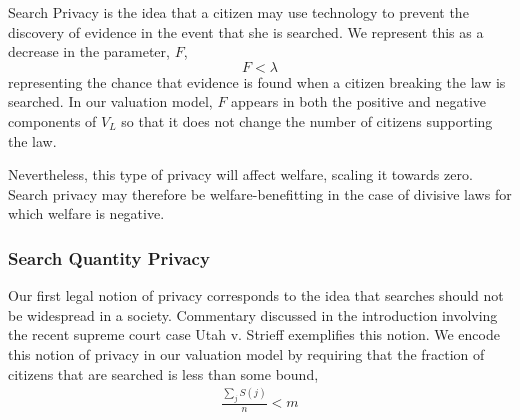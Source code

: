 Search Privacy is the idea that a citizen may use technology to prevent the discovery of evidence in the event that she is searched.  We represent this as a decrease in the parameter, $F$, 
$$F<\lambda$$
representing the chance that evidence is found when a citizen breaking the law is searched.  In our valuation model, $F$ appears in both the positive and negative components of $V_L$ so that it does not change the number of citizens supporting the law. 

Nevertheless, this type of privacy will affect welfare, scaling it towards zero.  Search privacy may therefore be welfare-benefitting in the case of divisive laws for which welfare is negative.

\subsubsection{Search Quantity Privacy}

Our first legal notion of privacy corresponds to the idea that searches should not be widespread in a society.  Commentary discussed in the introduction involving  the recent supreme court case Utah v. Strieff exemplifies this notion.
%
We encode this notion of privacy in our valuation model by requiring that the fraction of citizens that are searched is less than some bound, 
\begin{align}
\frac{\sum_j S(j)}{n} < m
\end{align}

